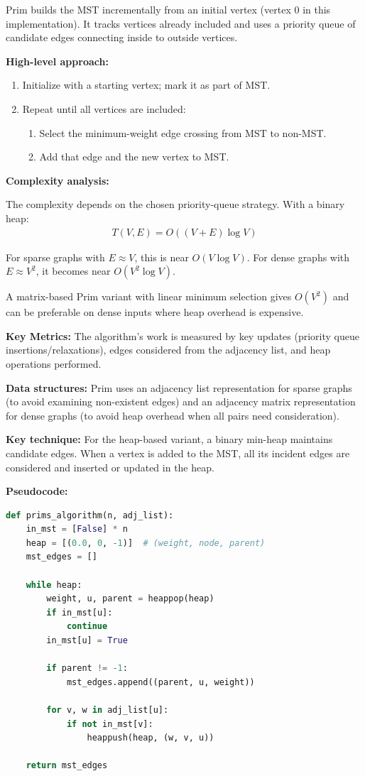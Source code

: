 \documentclass{labreport}
\begin{document}
Prim builds the MST incrementally from an initial vertex (vertex 0 in this implementation). It tracks vertices already included and uses a priority queue of candidate edges connecting inside to outside vertices.

\textbf{High-level approach:}
\begin{enumerate}
    \item Initialize with a starting vertex; mark it as part of MST.
    \item Repeat until all vertices are included:
    \begin{enumerate}
        \item Select the minimum-weight edge crossing from MST to non-MST.
        \item Add that edge and the new vertex to MST.
    \end{enumerate}
\end{enumerate}

\textbf{Complexity analysis:}

The complexity depends on the chosen priority-queue strategy. With a binary heap:
\begin{align*}
    T(V, E) = O((V + E) \log V)
\end{align*}

For sparse graphs with $E \approx V$, this is near $O(V \log V)$. For dense graphs with $E \approx V^2$, it becomes near $O(V^2 \log V)$.

A matrix-based Prim variant with linear minimum selection gives $O(V^2)$ and can be preferable on dense inputs where heap overhead is expensive.

\textbf{Key Metrics:} The algorithm's work is measured by key updates (priority queue insertions/relaxations), edges considered from the adjacency list, and heap operations performed.

\textbf{Data structures:} Prim uses an adjacency list representation for sparse graphs (to avoid examining non-existent edges) and an adjacency matrix representation for dense graphs (to avoid heap overhead when all pairs need consideration).

\textbf{Key technique:} For the heap-based variant, a binary min-heap maintains candidate edges. When a vertex is added to the MST, all its incident edges are considered and inserted or updated in the heap.

\textbf{Pseudocode:}
\begin{lstlisting}[language=Python]
def prims_algorithm(n, adj_list):
    in_mst = [False] * n
    heap = [(0.0, 0, -1)]  # (weight, node, parent)
    mst_edges = []

    while heap:
        weight, u, parent = heappop(heap)
        if in_mst[u]:
            continue
        in_mst[u] = True

        if parent != -1:
            mst_edges.append((parent, u, weight))

        for v, w in adj_list[u]:
            if not in_mst[v]:
                heappush(heap, (w, v, u))

    return mst_edges
\end{lstlisting}
\end{document}
